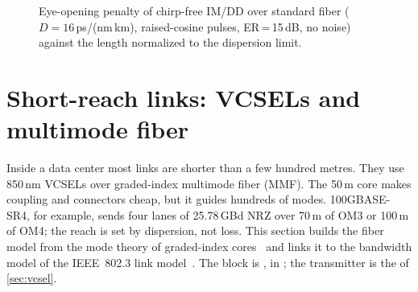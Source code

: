\begin{figure}[htbp]
\centering
{}
\caption{Eye-opening penalty of chirp-free IM/DD over standard fiber ($D=16$\,ps/(nm\,km), raised-cosine
pulses, ER\,=\,15\,dB, no noise) against the length normalized to the dispersion limit.}
\label{fig:cd-limit}
\end{figure}

\section{Short-reach links: VCSELs and multimode fiber}\label{sec:mmf}
Inside a data center most links are shorter than a few hundred metres. They use 850\,nm VCSELs
over graded-index multimode fiber (MMF). The 50\,\textmu m core makes coupling and connectors cheap, but
it guides hundreds of modes. 100GBASE-SR4, for example, sends four lanes of 25.78\,GBd NRZ over
70\,m of OM3 or 100\,m of OM4; the reach is set by dispersion, not loss. This section builds the
fiber model from the mode theory of graded-index cores~\cite{gloge1973,olshansky1976} and links it
to the bandwidth model of the IEEE~802.3 link model~\cite{cunningham2002}. The block is
, in ; the transmitter is the  of
\cref{sec:vcsel}.


